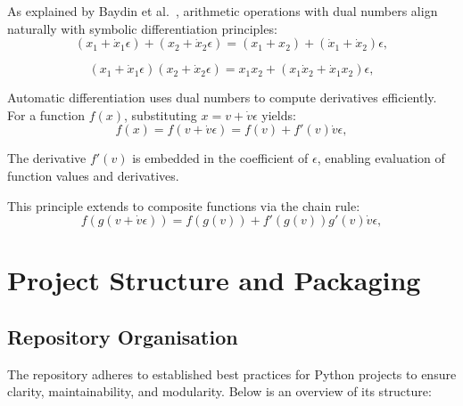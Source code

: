 \documentclass[a4paper,12pt]{article}
\begin{document}
As explained by Baydin et al.~\cite{baydin2018automatic}, arithmetic operations with dual numbers align naturally with symbolic differentiation principles:
\begin{equation}
    (x_1 + \dot{x}_1\epsilon) + (x_2 + \dot{x}_2\epsilon) = (x_1 + x_2) + (\dot{x}_1 + \dot{x}_2)\epsilon,
    \label{eq:dual_addition}
    \end{equation}
    
    \begin{equation}
    (x_1 + \dot{x}_1\epsilon)(x_2 + \dot{x}_2\epsilon) = x_1x_2 + (x_1\dot{x}_2 + \dot{x}_1x_2)\epsilon,
    \label{eq:dual_multiplication}
    \end{equation}
    
Automatic differentiation uses dual numbers to compute derivatives efficiently. For a function \(f(x)\), substituting \(x = v + \dot{v}\epsilon\) yields:
\begin{equation}
    f(x) = f(v + \dot{v}\epsilon) = f(v) + f'(v)\dot{v}\epsilon,
    \label{eq:dual_function}
    \end{equation}
    
The derivative \(f'(v)\) is embedded in the coefficient of \(\epsilon\), enabling evaluation of function values and derivatives.

This principle extends to composite functions via the chain rule:
\begin{equation}
    f(g(v + \dot{v}\epsilon)) = f(g(v)) + f'(g(v))g'(v)\dot{v}\epsilon,
    \label{eq:composite_function}
    \end{equation}
    
    \section{Project Structure and Packaging}

    \subsection{Repository Organisation}
    The repository adheres to established best practices for Python projects to ensure clarity, maintainability, and modularity. Below is an overview of its structure:
    
\end{document}
